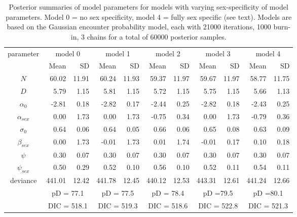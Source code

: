 \begin{table}[ht]
\centering
\caption{
Posterior summaries of model parameters for models with varying
sex-specificity of model parameters. Model 0 = no sex specificity,
model 4 = fully sex specific (see text). Models are based on the 
 Gaussian encounter probability model, each with 21000 iterations,
 1000 burn-in, 3 chains for a total of 60000 posterior samples. }
{\tiny
\begin{tabular}{crrrrrrrrrr} \hline \hline
parameter & \multicolumn{2}{c}{model 0} &
\multicolumn{2}{c}{model 1} &
\multicolumn{2}{c}{model 2} &
\multicolumn{2}{c}{model 3} &
\multicolumn{2}{c}{model 4}  \\
          &    Mean &   SD &      Mean &   SD &      Mean &   SD &
          Mean&     SD  & Mean & SD \\ \hline
$N$       &  60.02& 11.91&  60.24& 11.93&  59.37& 11.97&  59.67& 11.97&  58.77& 11.75\\
$D$       &   5.79&  1.15&   5.81&  1.15&   5.72&  1.15&   5.75&  1.15&   5.66&  1.13\\
$\alpha_0$&  -2.81&  0.18&  -2.82&  0.17&  -2.44&  0.25&  -2.82&  0.18&  -2.43&  0.25\\
$\alpha_{sex}$ &   0.00&  1.73&   0.00&  1.73&  -0.75&  0.34&   0.00&  1.73&  -0.79&  0.36\\
$\sigma_0$    &  0.64&  0.06&   0.64&  0.05&   0.66&  0.06&   0.65&  0.08&   0.63&  0.09\\
$\beta_{sex} $ &  0.00&  1.73&  -0.01&  1.73&   0.01&  1.74&  -0.01&  0.17&   0.10&  0.18\\
$\psi$         &0.30&  0.07&   0.30&  0.07&   0.30&  0.07&   0.30&  0.07&   0.30&  0.07\\
$\psi_{sex}$    & 0.50&  0.29&   0.52&  0.10&   0.56&  0.10&   0.52&  0.11&   0.54&  0.11\\
deviance   &441.01& 12.42& 441.78& 12.45& 440.12& 12.53& 443.31& 12.61&441.24& 12.66 \\
& \multicolumn{2}{c}{pD = 77.1} &\multicolumn{2}{c}{pD = 77.5} & \multicolumn{2}{c}{pD = 78.4}& \multicolumn{2}{c}{pD =79.5}  & \multicolumn{2}{c}{pD =80.1}  \\
& \multicolumn{2}{c}{DIC = 518.1} & \multicolumn{2}{c}{DIC = 519.3} &\multicolumn{2}{c}{DIC = 518.6} &    \multicolumn{2}{c}{DIC = 522.8} &\multicolumn{2}{c}{DIC = 521.3} \\ \hline
\end{tabular}
}
\label{gof.tab.dic}
\end{table}





